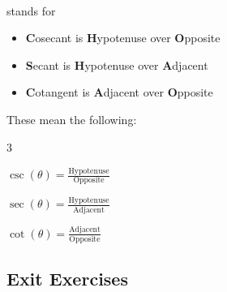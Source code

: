 \vfill
\begin{myDefinition}[{CHOSHACAO}]~\\[0.5mm]
	\label{CHOSHACAO}
	 stands for 
	\begin{itemize}
		\item \textbf{C}osecant is \textbf{H}ypotenuse over \textbf{O}pposite
		\item \textbf{S}ecant is \textbf{H}ypotenuse over \textbf{A}djacent
		\item \textbf{C}otangent is \textbf{A}djacent over \textbf{O}pposite
	\end{itemize}

	These mean the following:

	\begin{itemize}
	\end{itemize}
\end{myDefinition}
\vfill
\newpage

\subsection*{Exit Exercises} \label{exit-exercises-section-right-triangle-trigonometry}

